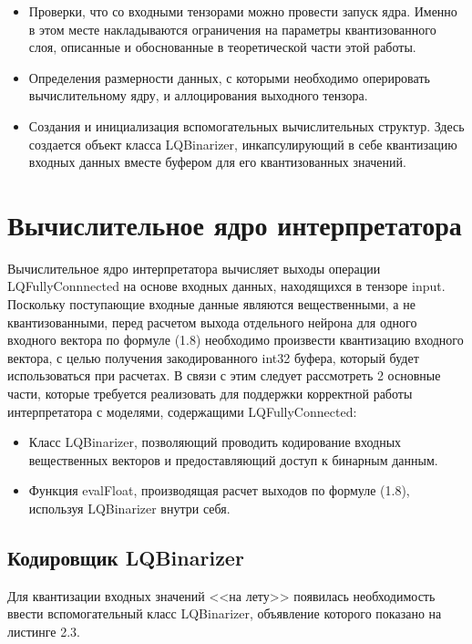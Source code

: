 \begin{itemize}
    \item Проверки, что со входными тензорами можно провести запуск ядра. Именно в этом месте накладываются ограничения на параметры квантизованного слоя, описанные и обоснованные в теоретической части этой работы.
    \item Определения размерности данных, с которыми необходимо оперировать вычислительному ядру, и аллоцирования выходного тензора.
    \item Создания и инициализация вспомогательных вычислительных структур. Здесь создается объект класса LQBinarizer, инкапсулирующий в себе квантизацию входных данных вместе буфером для его квантизованных значений.
\end{itemize}

\section{Вычислительное ядро интерпретатора}

Вычислительное ядро интерпретатора вычисляет выходы операции LQFullyConnnected на основе входных данных, находящихся в тензоре input. Поскольку поступающие входные данные являются вещественными, а не квантизованными, перед расчетом выхода отдельного нейрона для одного входного вектора по формуле (1.8) необходимо произвести квантизацию входного вектора, с целью получения закодированного int32 буфера, который будет использоваться при расчетах. В связи с этим следует рассмотреть 2 основные части, которые требуется реализовать для поддержки корректной работы интерпретатора с моделями, содержащими LQFullyConnected:

\begin{itemize}
    \item Класс LQBinarizer, позволяющий проводить кодирование входных вещественных векторов и предоставляющий доступ к бинарным данным.
    \item Функция evalFloat, производящая расчет выходов по формуле (1.8), используя LQBinarizer внутри себя.
\end{itemize}

\subsection{Кодировщик LQBinarizer}

Для квантизации входных значений <<на лету>> появилась необходимость ввести вспомогательный класс LQBinarizer, объявление которого показано на листинге 2.3.


